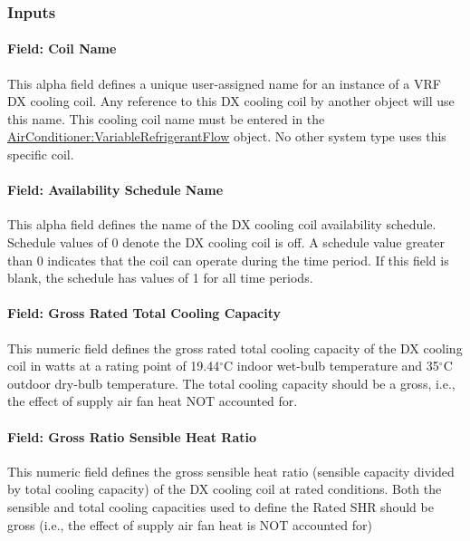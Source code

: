 \subsubsection{Inputs}\label{inputs-6-010}

\paragraph{Field: Coil Name}\label{field-coil-name-000}

This alpha field defines a unique user-assigned name for an instance of a VRF DX cooling coil. Any reference to this DX cooling coil by another object will use this name. This cooling coil name must be entered in the \hyperref[airconditionervariablerefrigerantflow]{AirConditioner:VariableRefrigerantFlow} object. No other system type uses this specific coil.

\paragraph{Field: Availability Schedule Name}\label{field-availability-schedule-name-1-007}

This alpha field defines the name of the DX cooling coil availability schedule. Schedule values of 0 denote the DX cooling coil is off. A schedule value greater than 0 indicates that the coil can operate during the time period. If this field is blank, the schedule has values of 1 for all time periods.

\paragraph{Field: Gross Rated Total Cooling Capacity}\label{field-gross-rated-total-cooling-capacity}

This numeric field defines the gross rated total cooling capacity of the DX cooling coil in watts at a rating point of 19.44$^\circ$C indoor wet-bulb temperature and 35$^\circ$C outdoor dry-bulb temperature. The total cooling capacity should be a gross, i.e., the effect of supply air fan heat NOT accounted for.

\paragraph{Field: Gross Ratio Sensible Heat Ratio}\label{field-gross-ratio-sensible-heat-ratio}

This numeric field defines the gross sensible heat ratio (sensible capacity divided by total cooling capacity) of the DX cooling coil at rated conditions. Both the sensible and total cooling capacities used to define the Rated SHR should be gross (i.e., the effect of supply air fan heat is NOT accounted for)

